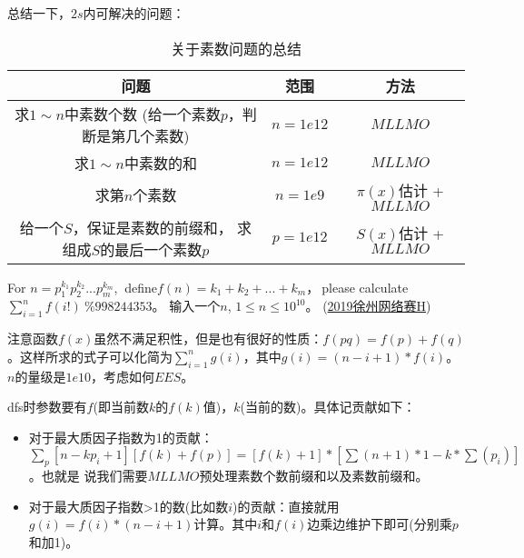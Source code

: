 \vbox{}

\begin{note}
	总结一下，$2s$内可解决的问题：
		\begin{table}[!htbp]
			\centering
			\caption{关于素数问题的总结 \label{tab:summaryforprime}}
			\begin{spacing}{1}
				\begin{tabular}{|c|c|c|}
					\toprule[1pt]
					问题 & 范围 & 方法 \\
					\midrule[1.5pt]
					\tabincell{c}{求$1\sim n$中素数个数 \\ (给一个素数$p$，判断是第几个素数)} &   $n= 1e12$ &  $MLLMO$ \\
					\midrule[1pt]
					求$1\sim n$中素数的和 &  $n=1e12$ & $MLLMO$  \\
					\midrule[1pt]
					求第$n$个素数  &  $n=1e9 $ &  $\pi(x)$估计 + $MLLMO$ \\
					\midrule[1pt]
					\tabincell{c}{给一个$S$，保证是素数的前缀和， \\ 求组成$S$的最后一个素数$p$}  &   $p=1e12$ &  $S(x)$估计 + $MLLMO$ \\
					\bottomrule[1pt]
				\end{tabular}%
			\end{spacing}
		\end{table}%
\end{note}

\vbox{}


\begin{example}
	For $n=p_1^{k_1}p_2^{k_2}...p_m^{k_m}$, $\ $define$f(n)=k_1 + k_2 + ... + k_m$，$\ $please calculate $\sum_{i=1}^n f(i!)\ \%998244353$。
	输入一个$n$, $1\le n \le 10^{10}$。
	(\href{https://nanti.jisuanke.com/t/41390}{2019徐州网络赛H})
\end{example}
\begin{solution}
	注意函数$f(x)$虽然不满足积性，但是也有很好的性质：$f(pq) = f(p) + f(q)$。这样所求的式子可以化简为$\sum_{i=1}^n g(i)$，其中$g(i)=(n-i+1)*f(i)$。
	$n$的量级是$1e10$，考虑如何$EES$。
	
	dfs时参数要有$f$(即当前数$k$的$f(k)$值)，$k$(当前的数)。具体记贡献如下：
	\begin{itemize}
		\item 对于最大质因子指数为1的贡献：$\sum_{p}\left[n-k p_{i}+1\right][f(k)+f(p)]=[f(k)+1] *\left[\sum(n+1) * 1-k * \sum\left(p_{i}\right)\right]$。也就是
		说我们需要$MLLMO$预处理素数个数前缀和以及素数前缀和。
		\item 对于最大质因子指数>1的数(比如数$i$)的贡献：直接就用$g(i)=f(i)*(n-i+1)$计算。其中$i$和$f(i)$边乘边维护下即可(分别乘$p$和加1)。
	\end{itemize}

	
\end{solution}





